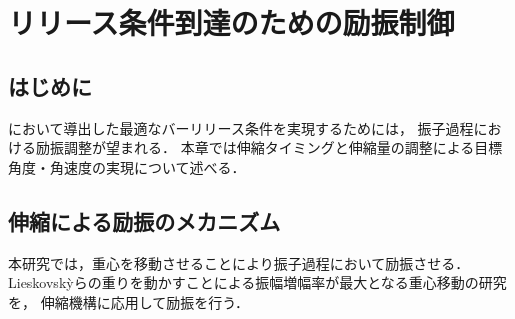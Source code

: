 \chapter[リリース条件到達のための励振制御]%
{リリース条件到達のための励振制御}
        \section{はじめに}

        において導出した最適なバーリリース条件を実現するためには，
        振子過程における励振調整が望まれる．
        本章では伸縮タイミングと伸縮量の調整による目標角度・角速度の実現について述べる．
          
        \section{伸縮による励振のメカニズム}

          本研究では，重心を移動させることにより振子過程において励振させる．
          Lieskovsk{\`y}らの重りを動かすことによる振幅増幅率が最大となる重心移動の研究\cite{lieskovsky2023optimal}を，
          伸縮機構に応用して励振を行う．
          
